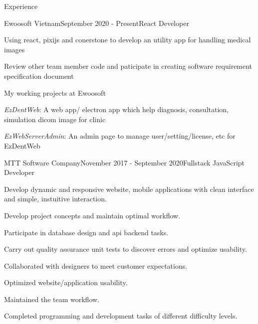\documentclass{resume}
\begin{document}
  \begin{rSection}{Experience}
    \begin{rSubsection}{Ewoosoft Vietnam}{September 2020 - Present}{React Developer}{}
      \item Using react, pixijs and conerstone to develop an utility app for handling medical images
      \item Review other team member code and paticipate in creating software requirement specification document 
    \end{rSubsection}

    \begin{rSubsection}{}{}{My working projects at Ewoosoft}{}
      \item {\emph{EzDentWeb}}: A web app/ electron app which help diagnosis, consultation, simulation dicom image for clinic
      \item {\emph{EzWebServerAdmin}}: An admin page to manage user/setting/license, etc for EzDentWeb
    \end{rSubsection}

    \begin{rSubsection}{MTT Software Company}{November 2017 - September 2020}{Fullstack JavaScript Developer}{}
      \item Develop dynamic and responsive website, mobile applications with clean interface and simple, instuitive interaction.
      \item Develop project concepts and maintain optimal workflow.
      \item Participate in database design and api backend tasks.
      \item Carry out quality assurance unit tests to discover errors and optimize usability.
      \item Collaborated with designers to meet customer expectations.
      \item Optimized website/application usability.
      \item Maintained the team workflow.
      \item Completed programming and development tasks of different difficulty levels.
    \end{rSubsection}


\end{rSection}
\end{document}
